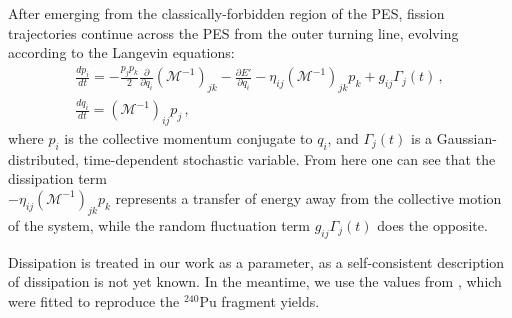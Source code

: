 After emerging from the classically-forbidden region of the PES, fission trajectories continue across the PES from the outer turning line, evolving according to the Langevin equations:
\begin{gather}\label{eq:langevin} 
	\frac{dp_i}{dt} =  
	-\frac{p_j p_k}{2} \frac{\partial}{\partial q_i}\left(\mathcal{M}^{-1}\right)_{jk} 
	- \frac{\partial E'}{\partial q_i}  - \eta_{ij}\left(\mathcal{M}^{-1}\right)_{jk} p_k + g_{ij}\Gamma_j(t) \,, \\ 
	\frac{dq_i}{dt} = 	\left(\mathcal{M}^{-1}\right)_{ij} p_j \,,  
\end{gather} 
\noindent where $p_i$ is the collective momentum conjugate to $q_i$, and $\Gamma_j(t)$ is a Gaussian-distributed, time-dependent stochastic variable. From here one can see that the dissipation term\\\noindent $- \eta_{ij}\left(\mathcal{M}^{-1}\right)_{jk} p_k$ represents a transfer of energy away from the collective motion of the system, while the random fluctuation term $g_{ij}\Gamma_j(t)$ does the opposite.

Dissipation is treated in our work as a parameter, as a self-consistent description of dissipation is not yet known.  In the meantime, we use the values from \cite{Sadhukhan2016}, which were fitted to reproduce the $^{240}$Pu fragment yields.%

